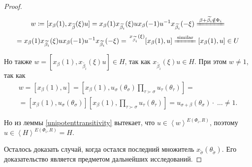 \documentclass[15pt]{article}
\theoremstyle{remark}
\begin{document}
\begin{proof}
$$
w \coloneqq [x_\beta(1), x_{\widetilde{\beta}}(\xi)u] =
x_\beta(1) x_{\widetilde{\beta_i}}(\xi) u x_\beta(-1) u^{-1} x_{\widetilde{\beta_i}}(-\xi)
\xlongequal{\beta+\widetilde{\beta_i}\notin\Phi_i}$$
$$=x_\beta(1) x_{\widetilde{\beta_i}}(\xi) u x_\beta(-1) u^{-1} x_{\widetilde{\beta_i}}(-\xi) = \,
^{x_{\widetilde{\beta_i}}(\xi)}[x_\beta(1),u] \xlongequal{\text{similar}} [x_\beta(1),u] \in U
$$ 

Но также $ w = [x_\beta(1), x_{\widetilde{\beta_i}}(\xi)u] \in H$, так как $x_{\widetilde{\beta_i}}(\xi)u \in H$. При этом $w \ne 1$, так как
\begin{align*}
w = [x_\beta(1),u] = [x_\beta(1),u_\sigma(\theta_\sigma)\prod_{\tau\succ\sigma}u_\tau(\theta_\tau)] =\\
=[x_\beta(1),u_\sigma(\theta_\sigma)][x_\beta(1),\prod_{\tau\succ\sigma}u_\tau(\theta_\tau)]=
u_{\sigma+\beta}(\theta_\sigma)\cdot \;\ldots \ne 1.
\end{align*}

Но из леммы \ref{unipotenttransitivity} вытекает, что
$u \in \left<w\right>^{E(\Phi_i,R)}$, поэтому $u \in \left<H\right>^{E(\Phi_i,R)} = H$.

Осталось доказать случай, когда остался последний множитель $x_{\widetilde{\sigma}}(\theta_{\widetilde{\sigma}})$. Его доказательство является предметом дальнейших исследований.


\end{proof}



\end{document}

